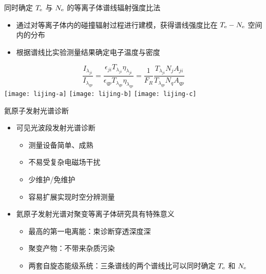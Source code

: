 \begin{CJK*}{UTF8}{kai}
\begin{frame}{同时确定 $T_{\rm e}$ 与 $N_{\rm e}$ 的等离子体谱线辐射强度比法}
	\begin{itemize}
  		\item 通过对等离子体内的碰撞辐射过程进行建模，获得谱线强度比在 $T_{\rm e}-N_{\rm e}$ 空间内的分布
  		\item 根据谱线比实验测量结果确定电子温度与密度
	\end{itemize}
\vspace*{-2em}
	\begin{center}
		$$
		\frac{I_{\lambda_{ji}}}{I_{\lambda_{qp}}}=	\frac{\epsilon_{ji}T_{\lambda_{ji}}\eta_{\lambda_{ji}}}{\epsilon_{qp}T_{\lambda_{qp}}\eta_{\lambda_{qp}}}
		=\frac{1}{F_R}\frac{T_{\lambda_{ji}}N_jA_{ji}}{T_{\lambda_{qp}}N_qA_{qp}}
		$$
	\texttt{[image: lijing-a]}
	\texttt{[image: lijing-b]}
	\texttt{[image: lijing-c]}
	\\
	\hfill{}
	\end{center}
\end{frame}


\begin{frame}{氦原子发射光谱诊断}
	\begin{itemize}
		\item 可见光波段发射光谱诊断
			\begin{itemize}
				\item 测量设备简单、成熟
				\item 不易受复杂电磁场干扰
				\item 少维护/免维护
				\item 容易扩展实现时空分辨测量
			\end{itemize}
		\bigskip
		\item 氦原子发射光谱对聚变等离子体研究具有特殊意义
			\begin{itemize}
				\item 最高的第一电离能：束诊断穿透深度深
				\item 聚变产物：不带来杂质污染
				\item 两套自旋态能级系统：三条谱线的两个谱线比可以同时确定 $T_{\rm e}$ 和 $N_{\rm e}$
			\end{itemize}
	\end{itemize}
\end{frame}



\end{CJK*}
